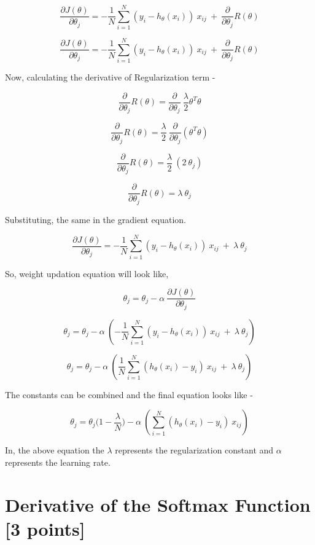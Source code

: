 $$ \frac{\partial J(\theta)}{\partial \theta_j} =-\frac{1}{N}\sum_{i=1}^{N} (y_i - h_\theta(x_i)) \ x_{ij} \ + \ \frac{\partial}{\partial \theta_j} R(\theta)$$


$$ \frac{\partial J(\theta)}{\partial \theta_j} =-\frac{1}{N}\sum_{i=1}^{N} (y_i - h_\theta(x_i)) \ x_{ij} \ + \  \frac{\partial}{\partial \theta_j} R(\theta)$$

Now, calculating the derivative of Regularization term - 

$$ \frac{\partial}{\partial \theta_j} R(\theta) = \frac{\partial}{\partial \theta_j} \  \dfrac{\lambda}{2}\theta^T\theta $$ 

$$ \frac{\partial}{\partial \theta_j} R(\theta) = \dfrac{\lambda}{2} \ \frac{\partial}{\partial \theta_j} (\theta^T\theta) $$

$$ \frac{\partial}{\partial \theta_j} R(\theta) = \dfrac{\lambda}{2} \ (2 \ \theta_j) $$

$$ \frac{\partial}{\partial \theta_j} R(\theta) = \lambda \ \theta_j$$

Substituting, the same in the gradient equation. 

$$ \frac{\partial J(\theta)}{\partial \theta_j} =-\frac{1}{N}\sum_{i=1}^{N} (y_i - h_\theta(x_i)) \ x_{ij} \ + \  \lambda \ \theta_j$$

So, weight updation equation will look like, 

$$ \theta_j = \theta_j - \alpha \ \frac{\partial J(\theta)}{\partial \theta_j} $$

$$ \theta_j = \theta_j - \alpha \ (-\frac{1}{N}\sum_{i=1}^{N} (y_i - h_\theta(x_i)) \ x_{ij} \ + \  \lambda \ \theta_j) $$

$$ \theta_j = \theta_j - \alpha \ (\frac{1}{N}\sum_{i=1}^{N} (h_\theta(x_i)-y_i) \ x_{ij} \ + \  \lambda \ \theta_j) $$

The constants can be combined and the final equation looks like - 

$$ \theta_j = \theta_j\Big(1-\frac{\lambda}{N}\Big) - \alpha \ (\sum_{i=1}^{N} (h_\theta(x_i)-y_i) \ x_{ij}) $$

In, the above equation the $\lambda$ represents the regularization constant and $\alpha$ represents the learning rate. 

\section{Derivative of the Softmax Function [3 points]}


